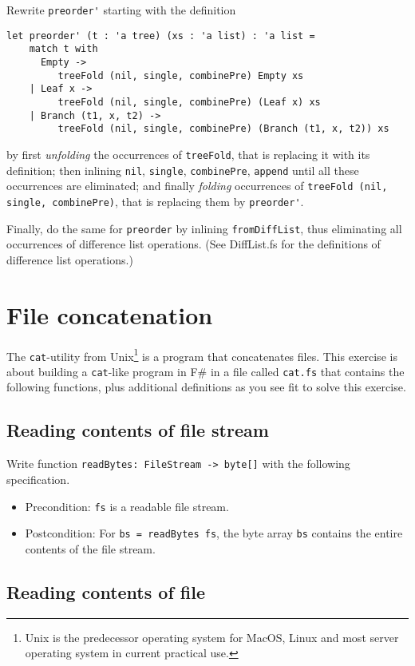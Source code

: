 \documentclass[a4paper,11pt]{article}
\begin{document}
\newpage Rewrite \verb|preorder'| starting with the definition
\begin{verbatim}
let preorder' (t : 'a tree) (xs : 'a list) : 'a list =
    match t with
      Empty -> 
         treeFold (nil, single, combinePre) Empty xs
    | Leaf x -> 
         treeFold (nil, single, combinePre) (Leaf x) xs 
    | Branch (t1, x, t2) -> 
         treeFold (nil, single, combinePre) (Branch (t1, x, t2)) xs 
\end{verbatim}
by first \emph{unfolding} the occurrences of \verb|treeFold|, that is replacing it with its definition; then inlining \verb|nil|, \verb|single|, \verb|combinePre|, \verb|append| until all these occurrences are eliminated; and finally \emph{folding} occurrences of \verb|treeFold (nil, single, combinePre)|, that is replacing them by \verb|preorder'|. 

Finally, do the same for \verb|preorder| by inlining \verb|fromDiffList|, thus eliminating all occurrences of difference list operations.
(See DiffList.fs for the definitions of difference list operations.) 


\section{File concatenation}

The \texttt{cat}-utility from 
Unix\footnote{Unix is the predecessor operating system for MacOS, Linux and most server operating system in current practical use.} 
is a program that concatenates files.  
This exercise is about building a \texttt{cat}-like program in F\# in a file called \texttt{cat.fs} that contains the following functions, plus additional definitions as you see fit to solve this exercise.

\subsection{Reading contents of file stream}

Write function \texttt{readBytes: FileStream -> byte[]} with the following specification.  
\begin{itemize}
\item Precondition: \texttt{fs} is a readable file stream.
\item Postcondition: For \texttt{bs = readBytes fs}, the byte array \texttt{bs} contains the entire contents of the file stream.   
\end{itemize}

\subsection{Reading contents of file}
\end{document}
